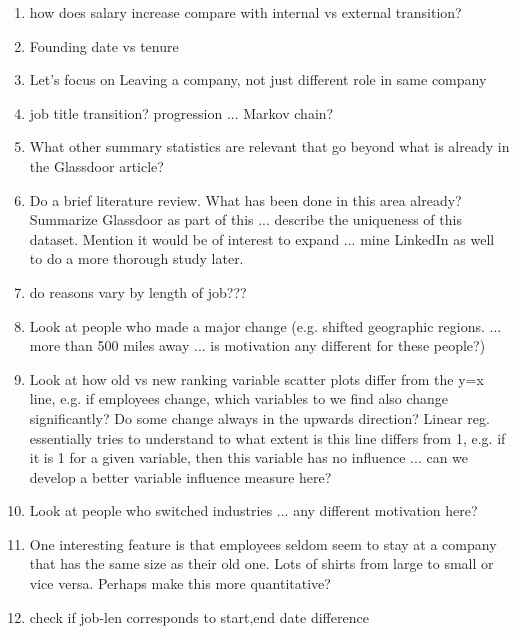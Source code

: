 \documentclass[10pt]{article}
\begin{document}
\begin{enumerate}
    \item how does salary increase compare with internal vs external transition? 
    \item Founding date vs tenure
    \item Let's focus on Leaving a company, not just different role in same company 
    \item job title transition? progression ... Markov chain? 
    \item What other summary statistics are relevant that go beyond what is already in 
          the Glassdoor article? 
    \item Do a brief literature review.  What has been done in this area already?
          Summarize Glassdoor as part of this ... describe the uniqueness of this dataset. 
          Mention it would be of interest to expand ... mine LinkedIn as well to do a 
          more thorough study later. 
    \item do reasons vary by length of job??? 
    \item Look at people who made a major change (e.g. shifted geographic regions. ... more than 500 miles 
          away ... is motivation any different for these people?)
    \item Look at how old vs new ranking variable scatter plots differ from the y=x line, 
        e.g. if employees change, which variables to we find also change significantly?  
          Do some change always in the upwards direction? Linear reg. essentially tries 
          to understand to what extent is this line differs from 1, e.g. if it is 1 for 
          a given variable, then this variable has no influence ... can we develop a 
          better variable influence measure here? 
    \item Look at people who switched industries ... any different motivation here? 
    \item One interesting feature is that employees seldom seem to stay at a company that has the 
          same size as their old one.  Lots of shirts from large to small or vice versa.  Perhaps 
          make this more quantitative? 
    \item  check if job-len corresponds to start,end date difference 

\end{enumerate}
\end{document}
